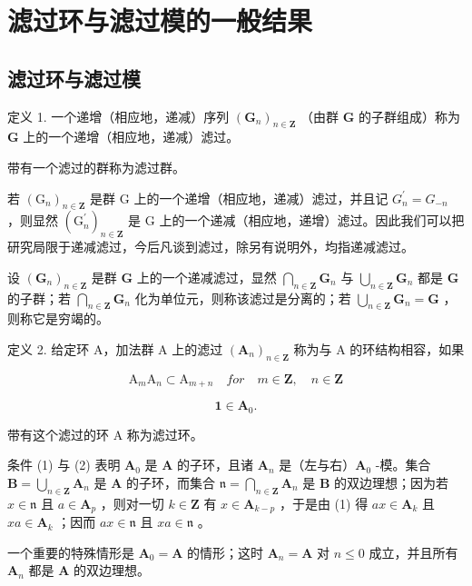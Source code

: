 \section{滤过环与滤过模的一般结果}

\subsection{滤过环与滤过模}

定义 1. 一个递增（相应地，递减）序列 \((\mathbf{G}_n)_{n\in \mathbf{Z}}\) （由群 \(\mathbf{G}\) 的子群组成）称为 \(\mathbf{G}\) 上的一个递增（相应地，递减）滤过。

带有一个滤过的群称为滤过群。

若 \((\mathrm{G}_{n})_{n\in\mathbf{Z}}\) 是群 G 上的一个递增（相应地，递减）滤过，并且记 \(G_{n}^{\prime}=G_{-n}\) ，则显然 \((\mathrm{G}_{n}^{\prime})_{n\in\mathbf{Z}}\) 是 G 上的一个递减（相应地，递增）滤过。因此我们可以把研究局限于递减滤过，今后凡谈到滤过，除另有说明外，均指递减滤过。

设 \((\mathbf{G}_n)_{n\in \mathbf{Z}}\) 是群 \(\mathbf{G}\) 上的一个递减滤过，显然 \(\bigcap_{n\in \mathbf{Z}}\mathbf{G}_n\) 与 \(\bigcup_{n\in \mathbf{Z}}\mathbf{G}_n\) 都是 \(\mathbf{G}\) 的子群；若 \(\bigcap_{n\in \mathbf{Z}}\mathbf{G}_n\) 化为单位元，则称该滤过是分离的；若 \(\bigcup_{n\in \mathbf{Z}}\mathbf{G}_n = \mathbf{G}\) ，则称它是穷竭的。

定义 2. 给定环 A，加法群 A 上的滤过 \((\mathbf{A}_n)_{n\in \mathbf{Z}}\) 称为与 A 的环结构相容，如果

\[
\mathrm{A} _ {m} \mathrm{A} _ {n} \subset \mathrm{A} _ {m + n} \quad for \quad m \in \mathbf {Z}, \quad n \in \mathbf {Z}\tag{1}
\]

\[
\mathbf {1} \in \mathbf {A} _ {0}.\tag{2}
\]

带有这个滤过的环 A 称为滤过环。

条件 (1) 与 (2) 表明 \(\mathbf{A}_0\) 是 \(\mathbf{A}\) 的子环，且诸 \(\mathbf{A}_n\) 是（左与右）\(\mathbf{A}_0\) -模。集合 \(\mathbf{B} = \bigcup_{n \in \mathbf{Z}} \mathbf{A}_n\) 是 \(\mathbf{A}\) 的子环，而集合 \(\mathfrak{n} = \bigcap_{n \in \mathbf{Z}} \mathbf{A}_n\) 是 \(\mathbf{B}\) 的双边理想；因为若 \(x \in \mathfrak{n}\) 且 \(a \in \mathbf{A}_p\) ，则对一切 \(k \in \mathbf{Z}\) 有 \(x \in \mathbf{A}_{k-p}\) ，于是由 (1) 得 \(ax \in \mathbf{A}_k\) 且 \(xa \in \mathbf{A}_k\) ；因而 \(ax \in \mathfrak{n}\) 且 \(xa \in \mathfrak{n}\) 。

一个重要的特殊情形是 \(\mathbf{A}_0 = \mathbf{A}\) 的情形；这时 \(\mathbf{A}_n = \mathbf{A}\) 对 \(n \leqslant 0\) 成立，并且所有 \(\mathbf{A}_n\) 都是 \(\mathbf{A}\) 的双边理想。

